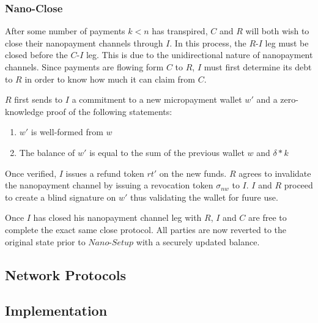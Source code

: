 \subsubsection{Nano-Close}

After some number of payments $k < n$ has transpired, $C$ and $R$ will both wish
to close their nanopayment channels through $I$. In this process, the $R$-$I$ leg
must be closed before the $C$-$I$ leg. This is due to the unidirectional nature
of nanopayment channels. Since payments are flowing form $C$ to $R$, $I$ must
first determine its debt to $R$ in order to know how much it can claim from $C$.

$R$ first sends to $I$ a commitment to a new micropayment wallet $w'$ and a
zero-knowledge proof of the following statements:

\begin{enumerate}
\item $w'$ is well-formed from $w$
\item The balance of $w'$ is equal to the sum of the previous wallet $w$ and
  $\delta * k$
\end{enumerate}

Once verified, $I$ issues a refund token $rt'$ on the new funds. $R$ agrees to
invalidate the nanopayment channel by issuing a revocation token $\sigma_{nw}$
to $I$. $I$ and $R$ proceed to create a blind signature on $w'$ thus validating
the wallet for fuure use.

Once $I$ has closed his nanopayment channel leg with $R$, $I$ and $C$ are free
to complete the exact same close protocol. All parties are now reverted to the
original state prior to $Nano$-$Setup$ with a securely updated balance.

\subsection{Network Protocols}

\subsection{Implementation}

